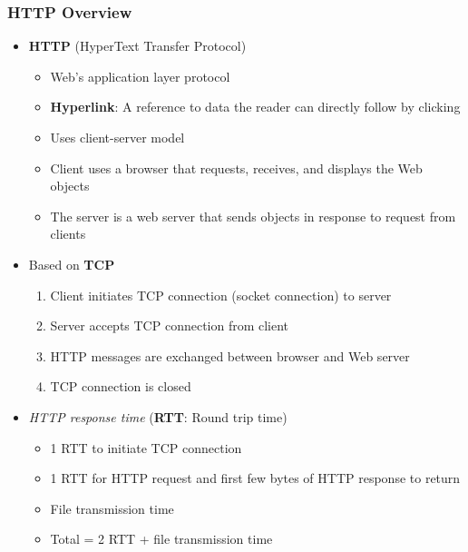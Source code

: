 \subsubsection{HTTP Overview}
\begin{itemize}
	\item \textbf{HTTP} (HyperText Transfer Protocol)
	\begin{itemize}
		\item Web's application layer protocol
		\item \textbf{Hyperlink}: A reference to data the reader can directly follow by clicking
		\item Uses client-server model
		\item Client uses a browser that requests, receives, and displays the Web objects
		\item The server is a web server that sends objects in response to request from clients
	\end{itemize}
	\item Based on \textbf{TCP}
	\begin{enumerate}
		\item Client initiates TCP connection (socket connection) to server
		\item Server accepts TCP connection from client
		\item HTTP messages are exchanged between browser and Web server
		\item TCP connection is closed
	\end{enumerate}
	\item \textit{HTTP response time} (\textbf{RTT}: Round trip time)
	\begin{itemize}
		\item 1 RTT to initiate TCP connection
		\item 1 RTT for HTTP request and first few bytes of HTTP response to return
		\item File transmission time
		\item Total = 2 RTT + file transmission time
	\end{itemize}
\end{itemize}

